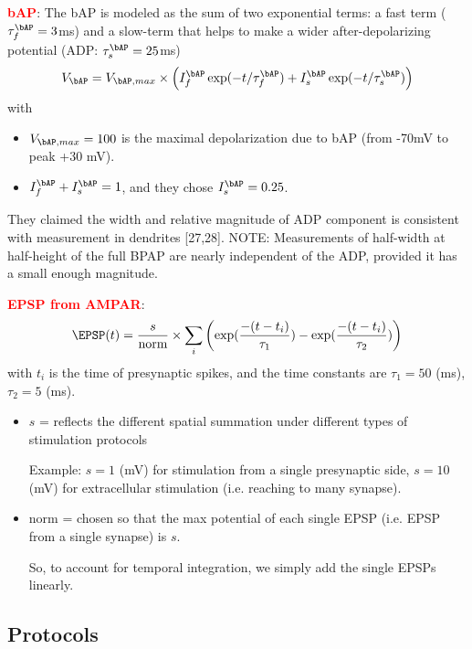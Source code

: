 \textcolor{red}{\bf bAP}: The bAP is modeled as the sum of two exponential
terms: a fast term ($\tau_f^\bAP=3$ms) and a slow-term that helps to make a
wider after-depolarizing potential (ADP: $\tau_s^\bAP = 25$ms)
\begin{equation}
V_\bAP = V_{\bAP,max} \times \left( I_f^\bAP \exp(-t/\tau_f^\bAP) + I_s^\bAP
\exp(-t/\tau_s^\bAP) \right)
\end{equation}
with  
\begin{itemize}
  \item $V_{\bAP,max}=100$ is the maximal depolarization due to bAP (from -70mV to
peak +30 mV).

  \item $I_f^\bAP + I_s^\bAP = 1$, and they chose $I_s^\bAP = 0.25$.
\end{itemize}


They claimed the width and relative magnitude of ADP component
is consistent with measurement in dendrites [27,28]. 
NOTE: Measurements of half-width at half-height of the full BPAP are
nearly independent of the ADP, provided it has a small enough
magnitude.

\textcolor{red}{\bf EPSP from AMPAR}:
\def\norm{{\text{norm}}} 
\begin{equation}
\EPSP(t) = \frac{s}{\norm} \times \sum_i \left( \exp( \frac{-(t-t_i)}{\tau_1}) -
\exp (\frac{-(t-t_i)}{\tau_2} ) \right)
\end{equation}
with $t_i$ is the time of presynaptic spikes, and the time constants are
$\tau_1 = 50$ (ms), $\tau_2 = 5$ (ms).
\begin{itemize}
  \item $s $ = reflects the different spatial summation under different types of
  stimulation protocols
  
  Example: $s=1$ (mV) for stimulation from a single presynaptic side, $s =
  10$ (mV) for extracellular stimulation (i.e. reaching to many synapse).
  
  \item $\norm$ = chosen so that the max potential of each single EPSP (i.e.
  EPSP from a single synapse) is $s$.
  
  So, to account for temporal integration, we simply add the single EPSPs
  linearly.
  
\end{itemize}

\subsection{Protocols}


